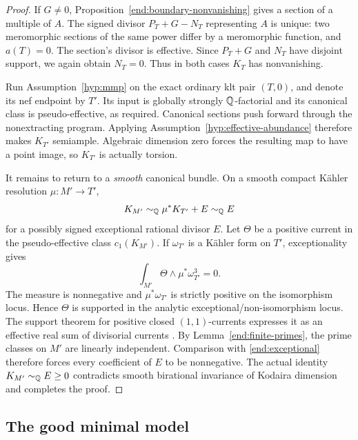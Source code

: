 \begin{proof}
If \(G\ne0\), Proposition~\ref{end:boundary-nonvanishing}
gives a section of a multiple of \(A\). The signed divisor
\(P_T+G-N_T\) representing \(A\) is unique: two meromorphic
sections of the same power differ by a meromorphic function, and
\(a(T)=0\). The section's divisor is effective. Since \(P_T+G\)
and \(N_T\) have disjoint support, we again obtain \(N_T=0\).
Thus in both cases \(K_T\) has nonvanishing.

Run Assumption~\ref{hyp:mmp} on the exact ordinary klt pair
\((T,0)\), and denote its nef endpoint by \(T'\). Its input
is globally strongly \(\mathbb{Q}\)-factorial and its canonical class
is pseudo-effective, as required. Canonical sections push forward
through the nonextracting program. Applying
Assumption~\ref{hyp:effective-abundance} therefore makes
\(K_{T'}\) semiample. Algebraic dimension zero forces the resulting
map to have a point image, so \(K_{T'}\) is actually torsion.

It remains to return to a \emph{smooth} canonical bundle. On a
smooth compact K\"ahler resolution \(\mu:M'\to T'\),
\begin{equation}\label{end:exceptional}
 K_{M'}\sim_{\mathbb{Q}}\mu^*K_{T'}+E\sim_{\mathbb{Q}}E
\end{equation}
for a possibly signed exceptional rational divisor \(E\). Let
\(\Theta\) be a positive current in the pseudo-effective class
\(c_1(K_{M'})\). If \(\omega_{T'}\) is a K\"ahler form on
\(T'\), exceptionality gives
\[
 \int_{M'}\Theta\wedge\mu^*\omega_{T'}^3=0.
\]
The measure is nonnegative and \(\mu^*\omega_{T'}\) is strictly
positive on the isomorphism locus. Hence \(\Theta\) is supported
in the analytic exceptional/non-isomorphism locus. The support
theorem for positive closed \((1,1)\)-currents expresses it as an
effective real sum of divisorial currents
\cite{DemaillyComplexAnalyticGeometry}. By
Lemma~\ref{end:finite-primes}, the prime classes on \(M'\) are
linearly independent. Comparison with \eqref{end:exceptional}
therefore forces every coefficient of \(E\) to be nonnegative.
The actual identity \(K_{M'}\sim_{\mathbb{Q}}E\ge0\) contradicts
smooth birational invariance of Kodaira dimension and completes
the proof.
\end{proof}

\subsection{The good minimal model}

